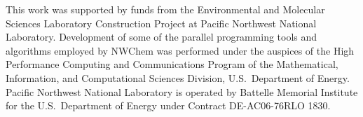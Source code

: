 %
%

This work was supported by funds from the Environmental and Molecular
Sciences Laboratory Construction Project at Pacific Northwest National
Laboratory.  Development of some of the parallel programming tools and
algorithms employed by NWChem was performed under the auspices of the
High Performance Computing and Communications Program of the
Mathematical, Information, and Computational Sciences Division, U.S.\
Department of Energy.  Pacific Northwest National Laboratory is
operated by Battelle Memorial Institute for the U.S.\ Department of
Energy under Contract DE-AC06-76RLO 1830.

